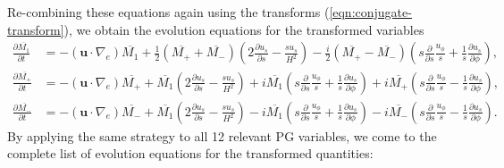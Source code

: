 Re-combining these equations again using the transforms (\ref{eqn:conjugate-transform}), we obtain the evolution equations for the transformed variables
\[\begin{aligned}
    \frac{\partial \overline{M_1}}{\partial t} &= - \left(\mathbf{u}\cdot \nabla_e \right) \overline{M_1} + \frac{1}{2} \left(\overline{M_+} + \overline{M_-}\right) \left(2\frac{\partial u_s}{\partial s} - \frac{su_s}{H^2}\right) - \frac{i}{2} \left(\overline{M_+} - \overline{M_-}\right) \left(s \frac{\partial}{\partial s}\frac{u_\phi}{s} + \frac{1}{s}\frac{\partial u_s}{\partial \phi}\right), \\
    \frac{\partial \overline{M_+}}{\partial t} &= - \left(\mathbf{u}\cdot \nabla_e \right) \overline{M_+} + \overline{M_1} \left(2\frac{\partial u_s}{\partial s} - \frac{su_s}{H^2}\right) + i\overline{M_1} \left(s \frac{\partial}{\partial s}\frac{u_\phi}{s} + \frac{1}{s}\frac{\partial u_s}{\partial \phi}\right) + i \overline{M_+} \left(s \frac{\partial}{\partial s}\frac{u_\phi}{s} - \frac{1}{s}\frac{\partial u_s}{\partial \phi}\right), \\ 
    \frac{\partial \overline{M_-}}{\partial t} &= - \left(\mathbf{u}\cdot \nabla_e \right) \overline{M_-} + \overline{M_1} \left(2\frac{\partial u_s}{\partial s} - \frac{su_s}{H^2}\right) - i\overline{M_1} \left(s \frac{\partial}{\partial s}\frac{u_\phi}{s} + \frac{1}{s}\frac{\partial u_s}{\partial \phi}\right) - i \overline{M_-} \left(s \frac{\partial}{\partial s}\frac{u_\phi}{s} - \frac{1}{s}\frac{\partial u_s}{\partial \phi}\right).
\end{aligned}\]
By applying the same strategy to all 12 relevant PG variables, we come to the complete list of evolution equations for the transformed quantities:
